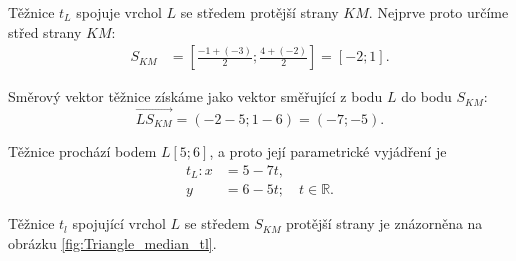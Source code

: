 \begin{example}
\begin{enumerate}[label=\alph*), leftmargin=2em]
        Těžnice $t_L$ spojuje vrchol $L$ se středem protější strany
        $KM$. Nejprve proto určíme střed strany $KM$:
        \begin{align*}
            S_{KM}
            &=
            \left[
                \frac{-1+(-3)}{2};
                \frac{4+(-2)}{2}
            \right]
            =
            [-2;1].
        \end{align*}

        Směrový vektor těžnice získáme jako vektor směřující z bodu
        $L$ do bodu $S_{KM}$:
        \[
            \overrightarrow{LS_{KM}}
            =
            (-2-5;1-6)
            =
            (-7;-5).
        \]

        Těžnice prochází bodem $L[5;6]$, a proto její parametrické
        vyjádření je
        \begin{align*}
            t_L: x &= 5-7t,\\
                 y &= 6-5t;
                 \quad t\in\mathbb{R}.
        \end{align*}

        Těžnice $t_l$ spojující vrchol $L$ se středem $S_{KM}$ protější strany je znázorněna na obrázku \ref{fig:Triangle_median_tl}.

        \begin{figure}[H]
            \centering
\end{figure}
\end{enumerate}
\end{example}
